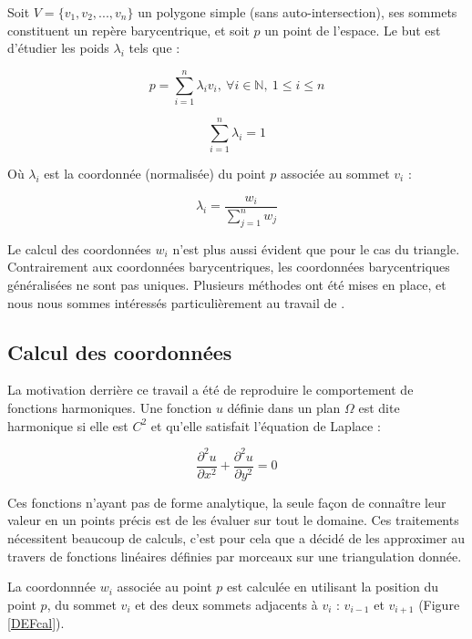 Soit $V = \{v_1, v_2, ..., v_n\}$ un polygone simple (sans auto-intersection),
ses sommets constituent un repère barycentrique, et soit $p$ un point de
l'espace. Le but est d'étudier les poids $\lambda_i$ tels que :

\begin{equation}
  p = \sum_{i=1}^{n} \lambda_i v_i ,
  ~ \forall i \in \mathbb{N} ,~ 1 \leq i \leq n
\end{equation}

\begin{equation}
  \sum_{i=1}^n \lambda_i = 1
\end{equation}

Où $\lambda_i$ est la coordonnée (normalisée) du point $p$ associée au sommet
$v_i$ :

\begin{equation}
  \lambda_i = \frac{w_i}{\sum_{j=1}^n w_j}
\end{equation}

Le calcul des coordonnées $w_i$ n'est plus aussi évident que pour le cas du
triangle. Contrairement aux coordonnées barycentriques, les coordonnées
barycentriques généralisées ne sont pas uniques. Plusieurs méthodes ont été
mises en place, et nous nous sommes intéressés particulièrement au travail de
\cite{Flo03}.

\subsection{Calcul des coordonnées}

La motivation derrière ce travail a été de reproduire le comportement de
fonctions harmoniques. Une fonction $u$ définie dans un plan $\Omega$ est dite
harmonique si elle est $C^2$ et qu'elle satisfait l'équation de Laplace :

\begin{equation}
  \frac{\partial^2 u}{\partial x^2} + \frac{\partial^2 u}{\partial y^2} = 0
\end{equation}

Ces fonctions n'ayant pas de forme analytique, la seule façon de connaître
leur valeur en un points précis est de les évaluer sur tout le domaine. Ces
traitements nécessitent beaucoup de calculs, c'est pour cela que \cite{Flo03}
a décidé de les approximer au travers de fonctions linéaires définies par
morceaux sur une triangulation donnée.

La coordonnnée $w_i$ associée au point $p$ est calculée en utilisant la
position du point $p$, du sommet $v_i$ et des deux sommets adjacents à $v_i$ :
$v_{i-1}$ et $v_{i+1}$ (Figure \ref{DEFcal}).


